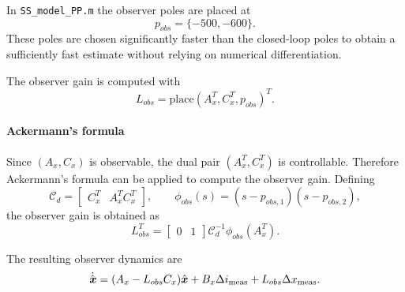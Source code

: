 In \texttt{SS\_model\_PP.m} the observer poles are placed at
\begin{equation}
    p_{obs} = \{-500, -600\}.
\end{equation}
These poles are chosen significantly faster than the closed-loop poles to obtain a sufficiently fast
estimate without relying on numerical differentiation.

The observer gain is computed with
\begin{equation}
    L_{obs} = \mathrm{place}(A_x^T, C_x^T, p_{obs})^T.
\end{equation}


\paragraph{Ackermann's formula}
Since $(A_x,C_x)$ is observable, the dual pair $(A_x^T,C_x^T)$ is controllable. Therefore
Ackermann's formula can be applied to compute the observer gain. Defining
\begin{equation}
    \mathcal{C}_d =
    \begin{bmatrix}
        C_x^T & A_x^T C_x^T
    \end{bmatrix},
    \qquad
    \phi_{obs}(s) =
    (s-p_{obs,1})(s-p_{obs,2}),
\end{equation}
the observer gain is obtained as
\begin{equation}
    L_{obs}^T =
    \begin{bmatrix}
        0 & 1
    \end{bmatrix}
    \mathcal{C}_d^{-1}
    \phi_{obs}(A_x^T).
\end{equation}

The resulting observer dynamics are
\begin{equation}
    \dot{\hat{\boldsymbol{x}}}
    =
    (A_x - L_{obs} C_x)\hat{\boldsymbol{x}}
    +
    B_x \Delta i_{\mathrm{meas}}
    +
    L_{obs} \Delta x_{\mathrm{meas}}.
\end{equation}

